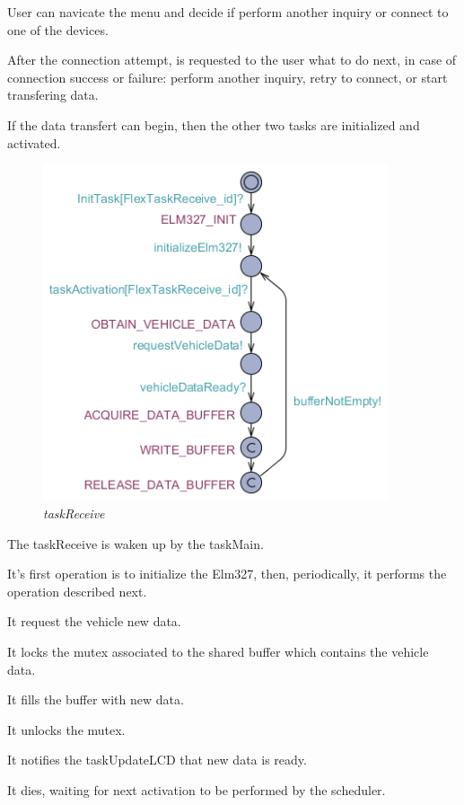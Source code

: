 \documentclass[paper=a4, fontsize=11pt]{scrartcl} %
\numberwithin{equation}{section} %
\numberwithin{figure}{section} %
\numberwithin{table}{section} %
\begin{document}
User can navicate the menu and decide if perform another inquiry or connect to one of the devices.

After the connection attempt, is requested to the user what to do next, in case of connection success or failure: perform another inquiry, retry to connect, or start transfering data.

If the data transfert can begin, then the other two tasks are initialized and activated.

\begin{figure}[H]
  \centering
  \includegraphics[width=4in]{img/FLEX-OBD-LCD_taskReceive}
  \caption{\textit{taskReceive}}
\end{figure}

The taskReceive is waken up by the taskMain.

It's first operation is to initialize the Elm327, then, periodically, it performs the operation described next.

It request the vehicle new data.

It locks the mutex associated to the shared buffer which contains the vehicle data.

It fills the buffer with new data.

It unlocks the mutex.

It notifies the taskUpdateLCD that new data is ready.

It dies, waiting for next activation to be performed by the scheduler.
\end{document}
